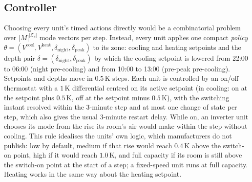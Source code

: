 \documentclass[10pt,a4paper,twocolumn]{article}
\theoremstyle{definition}
\begin{document}
\subsection{Controller}\label{sec:controller}
Choosing every unit's timed actions directly would be a combinatorial problem over $|M|^{|\mathcal{Z}_c|}$ mode vectors per step. Instead, every unit applies one compact \emph{policy} $\theta=(V^{\text{cool}},\allowbreak V^{\text{heat}},\allowbreak\delta_{\text{night}},\allowbreak\delta_{\text{peak}})$ to its zone: cooling and heating setpoints and the depth pair $\delta=(\delta_{\text{night}},\delta_{\text{peak}})$ by which the cooling setpoint is lowered from 22:00 to 06:00 (night pre-cooling) and from 10:00 to 13:00 (pre-peak pre-cooling). Setpoints and depths move in $0.5\,$K steps. Each unit is controlled by an on/off thermostat with a $1\,$K differential centred on its active setpoint (in cooling: on at the setpoint plus $0.5\,$K, off at the setpoint minus $0.5\,$K), with the switching instant resolved within the $3$-minute step and at most one change of state per step, which also gives the usual $3$-minute restart delay. While on, an inverter unit chooses its mode from the rise its room's air would make within the step without cooling. This rule idealises the units' own logic, which manufacturers do not publish: low by default, medium if that rise would reach $0.4\,$K above the switch-on point, high if it would reach $1.0\,$K, and full capacity if its room is still above the switch-on point at the start of a step; a fixed-speed unit runs at full capacity. Heating works in the same way about the heating setpoint.
\end{document}
